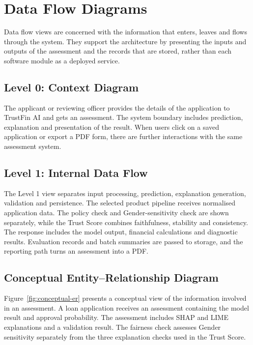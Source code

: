 \clearpage
\section{Data Flow Diagrams}
Data flow views are concerned with the information that enters, leaves and flows through the system. They support the architecture by presenting the inputs and outputs of the assessment and the records that are stored, rather than each software module as a deployed service.

\subsection{Level 0: Context Diagram}
The applicant or reviewing officer provides the details of the application to TrustFin AI and gets an assessment. The system boundary includes prediction, explanation and presentation of the result. When users click on a saved application or export a PDF form, there are further interactions with the same assessment system.

\clearpage

\subsection{Level 1: Internal Data Flow}
The Level 1 view separates input processing, prediction, explanation generation, validation and persistence. The selected product pipeline receives normalised application data. The policy check and Gender-sensitivity check are shown separately, while the Trust Score combines faithfulness, stability and consistency. The response includes the model output, financial calculations and diagnostic results. Evaluation records and batch summaries are passed to storage, and the reporting path turns an assessment into a PDF.

\clearpage

\subsection{Conceptual Entity--Relationship Diagram}
Figure~\ref{fig:conceptual-er} presents a conceptual view of the information involved in an assessment. A loan application receives an assessment containing the model result and approval probability. The assessment includes SHAP and LIME explanations and a validation result. The fairness check assesses Gender sensitivity separately from the three explanation checks used in the Trust Score.

